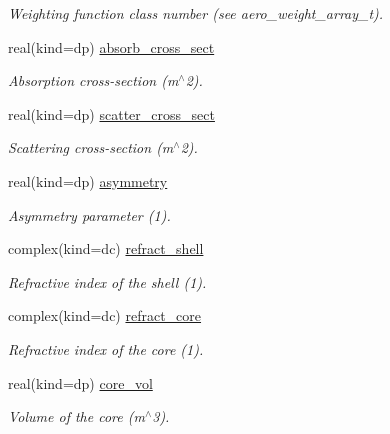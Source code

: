 \begin{DoxyCompactItemize}
\begin{DoxyCompactList}\small\item\em Weighting function class number (see {\ttfamily aero\+\_\+weight\+\_\+array\+\_\+t}). \end{DoxyCompactList}\item 
real(kind=dp) \mbox{\hyperlink{structpmc__aero__particle_1_1aero__particle__t_ac966076749f2d89847d225244dd83d7e}{absorb\+\_\+cross\+\_\+sect}}
\begin{DoxyCompactList}\small\item\em Absorption cross-\/section (m$^\wedge$2). \end{DoxyCompactList}\item 
real(kind=dp) \mbox{\hyperlink{structpmc__aero__particle_1_1aero__particle__t_a672820024540519c2cc55e9aa5e54dd2}{scatter\+\_\+cross\+\_\+sect}}
\begin{DoxyCompactList}\small\item\em Scattering cross-\/section (m$^\wedge$2). \end{DoxyCompactList}\item 
real(kind=dp) \mbox{\hyperlink{structpmc__aero__particle_1_1aero__particle__t_ac93d8e71c9a9385b3565a4c8080de4be}{asymmetry}}
\begin{DoxyCompactList}\small\item\em Asymmetry parameter (1). \end{DoxyCompactList}\item 
complex(kind=dc) \mbox{\hyperlink{structpmc__aero__particle_1_1aero__particle__t_afa4a517ae4842fc4ff0093e2ae76bf4b}{refract\+\_\+shell}}
\begin{DoxyCompactList}\small\item\em Refractive index of the shell (1). \end{DoxyCompactList}\item 
complex(kind=dc) \mbox{\hyperlink{structpmc__aero__particle_1_1aero__particle__t_a726ecf75b95fd62514966c48fa8e153a}{refract\+\_\+core}}
\begin{DoxyCompactList}\small\item\em Refractive index of the core (1). \end{DoxyCompactList}\item 
real(kind=dp) \mbox{\hyperlink{structpmc__aero__particle_1_1aero__particle__t_ade338af9496b6d75c152e13d8a94c3c2}{core\+\_\+vol}}
\begin{DoxyCompactList}\small\item\em Volume of the core (m$^\wedge$3). \end{DoxyCompactList}\item 

\end{DoxyCompactItemize}
